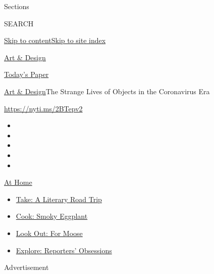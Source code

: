 Sections

SEARCH

\protect\hyperlink{site-content}{Skip to
content}\protect\hyperlink{site-index}{Skip to site index}

\href{https://www.nytimes.com/section/arts/design}{Art \& Design}

\href{https://myaccount.nytimes.com/auth/login?response_type=cookie\&client_id=vi}{}

\href{https://www.nytimes.com/section/todayspaper}{Today's Paper}

\href{/section/arts/design}{Art \& Design}\textbar{}The Strange Lives of
Objects in the Coronavirus Era

\url{https://nyti.ms/2BTepv2}

\begin{itemize}
\item
\item
\item
\item
\item
\end{itemize}

\href{https://www.nytimes.com/spotlight/at-home?action=click\&pgtype=Article\&state=default\&region=TOP_BANNER\&context=at_home_menu}{At
Home}

\begin{itemize}
\tightlist
\item
  \href{https://www.nytimes.com/2020/07/28/books/time-for-a-literary-road-trip.html?action=click\&pgtype=Article\&state=default\&region=TOP_BANNER\&context=at_home_menu}{Take:
  A Literary Road Trip}
\item
  \href{https://www.nytimes.com/2020/07/29/magazine/bored-with-your-home-cooking-some-smoky-eggplant-will-fix-that.html?action=click\&pgtype=Article\&state=default\&region=TOP_BANNER\&context=at_home_menu}{Cook:
  Smoky Eggplant}
\item
  \href{https://www.nytimes.com/2020/07/27/travel/moose-michigan-isle-royale.html?action=click\&pgtype=Article\&state=default\&region=TOP_BANNER\&context=at_home_menu}{Look
  Out: For Moose}
\item
  \href{https://www.nytimes.com/interactive/2020/at-home/even-more-reporters-editors-diaries-lists-recommendations.html?action=click\&pgtype=Article\&state=default\&region=TOP_BANNER\&context=at_home_menu}{Explore:
  Reporters' Obsessions}
\end{itemize}

Advertisement

